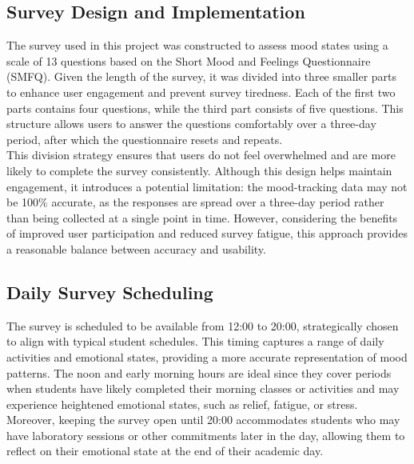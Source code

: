 \subsection{Survey Design and Implementation}
The survey used in this project was constructed to assess mood states using a scale of 13 questions based on the Short Mood and Feelings Questionnaire (SMFQ). Given the length of the survey, it was divided into three smaller parts to enhance user engagement and prevent survey tiredness. Each of the first two parts contains four questions, while the third part consists of five questions. This structure allows users to answer the questions comfortably over a three-day period, after which the questionnaire resets and repeats.\vspace{5mm} \\
This division strategy ensures that users do not feel overwhelmed and are more likely to complete the survey consistently. Although this design helps maintain engagement, it introduces a potential limitation: the mood-tracking data may not be 100\% accurate, as the responses are spread over a three-day period rather than being collected at a single point in time. However, considering the benefits of improved user participation and reduced survey fatigue, this approach provides a reasonable balance between accuracy and usability.

\vspace{5mm}

\subsection{Daily Survey Scheduling}
The survey is scheduled to be available from 12:00 to 20:00, strategically chosen to align with typical student schedules. This timing captures a range of daily activities and emotional states, providing a more accurate representation of mood patterns. The noon and early morning hours are ideal since they cover periods when students have likely completed their morning classes or activities and may experience heightened emotional states, such as relief, fatigue, or stress. Moreover, keeping the survey open until 20:00 accommodates students who may have laboratory sessions or other commitments later in the day, allowing them to reflect on their emotional state at the end of their academic day.

